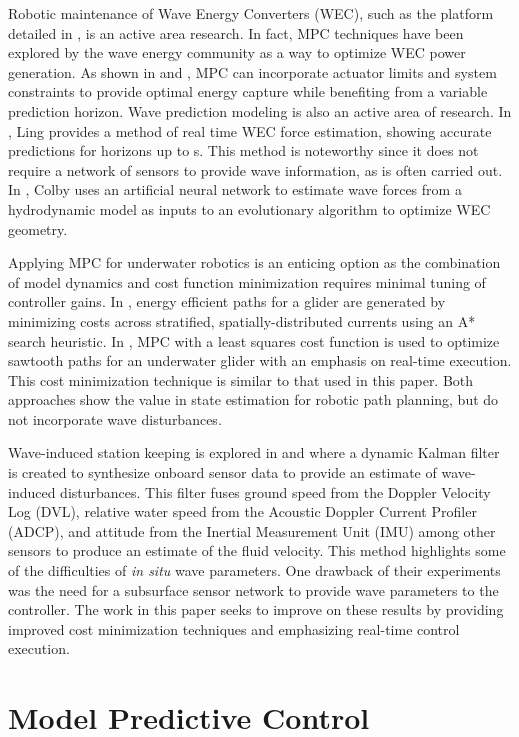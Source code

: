 \documentclass[letterpaper, 10 pt, conferences]{IEEEconf}  %
\begin{document}
Robotic maintenance of Wave Energy Converters (WEC), such as the platform detailed in \cite{joslin}, is an active area research. In fact, MPC techniques have been explored by the wave energy community as a way to optimize WEC power generation. As shown in \cite{brekken1} and \cite{brekken2}, MPC can incorporate actuator limits and system constraints to provide optimal energy capture while benefiting from a variable prediction horizon. Wave prediction modeling is also an active area of research. In \cite{ling}, Ling provides a method of real time WEC force estimation, showing accurate predictions for horizons up to \unit[15]{s}. This method is noteworthy since it does not require a network of sensors to provide wave information, as is often carried out. In \cite{colby}, Colby uses an artificial neural network to estimate wave forces from a hydrodynamic model as inputs to an evolutionary algorithm to optimize WEC geometry.

Applying MPC for underwater robotics is an enticing option as the combination of model dynamics and cost function minimization requires minimal tuning of controller gains. In \cite{huynh}, energy efficient paths for a glider are generated by minimizing costs across stratified, spatially-distributed currents using an A* search heuristic. In \cite{medagodaMPC}, MPC with a least squares cost function is used to optimize sawtooth paths for an underwater glider with an emphasis on real-time execution. This cost minimization technique is similar to that used in this paper. Both approaches show the value in state estimation for robotic path planning, but do not incorporate wave disturbances.

Wave-induced station keeping is explored in \cite{riedel1} and \cite{riedel2} where a dynamic Kalman filter is created to synthesize onboard sensor data to provide an estimate of wave-induced disturbances. This filter fuses ground speed from the Doppler Velocity Log (DVL), relative water speed from the Acoustic Doppler Current Profiler (ADCP), and attitude from the Inertial Measurement Unit (IMU) among other sensors to produce an estimate of the fluid velocity. This method highlights some of the difficulties of \textit{in situ} wave parameters. One drawback of their experiments was the need for a subsurface sensor network to provide wave parameters to the controller. The work in this paper seeks to improve on these results by providing improved cost minimization techniques and emphasizing real-time control execution.

\section{Model Predictive Control} 
\label{sec:mpc}
\end{document}
